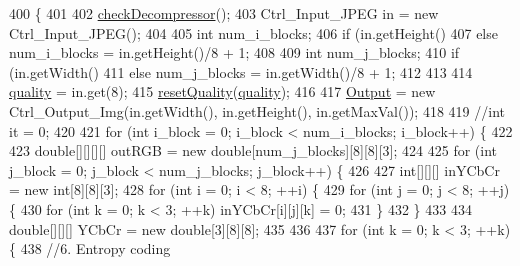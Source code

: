 \begin{DoxyCode}
400                                \{
401 
402         \hyperlink{classdomini_1_1algorithm_1_1Algorithm_a6b738342cc7169893fa60d593f5a13db}{checkDecompressor}();
403         Ctrl\_Input\_JPEG in = \textcolor{keyword}{new} Ctrl\_Input\_JPEG();
404 
405         \textcolor{keywordtype}{int} num\_i\_blocks;
406         \textcolor{keywordflow}{if} (in.getHeight()%
407         \textcolor{keywordflow}{else} num\_i\_blocks = in.getHeight()/8 + 1;
408         
409         \textcolor{keywordtype}{int} num\_j\_blocks;
410         \textcolor{keywordflow}{if} (in.getWidth()%
411         \textcolor{keywordflow}{else} num\_j\_blocks = in.getWidth()/8 + 1;
412 
413 
414         \hyperlink{classdomini_1_1algorithm_1_1JPEG_ae80176d5ff56e613643db55e21c513da}{quality} = in.get(8);
415         \hyperlink{classdomini_1_1algorithm_1_1JPEG_a860d6166ef8edc40b0ffb61942589e5d}{resetQuality}(\hyperlink{classdomini_1_1algorithm_1_1JPEG_ae80176d5ff56e613643db55e21c513da}{quality});
416 
417         \hyperlink{classdomini_1_1algorithm_1_1Algorithm_a4de9955411c656325adc391ef570c082}{Output} = \textcolor{keyword}{new} Ctrl\_Output\_Img(in.getWidth(), in.getHeight(), in.getMaxVal());
418 
419         \textcolor{comment}{//int it = 0;}
420 
421         \textcolor{keywordflow}{for} (\textcolor{keywordtype}{int} i\_block = 0; i\_block < num\_i\_blocks; i\_block++)  \{
422 
423             \textcolor{keywordtype}{double}[][][][] outRGB = \textcolor{keyword}{new} \textcolor{keywordtype}{double}[num\_j\_blocks][8][8][3];
424             
425             \textcolor{keywordflow}{for} (\textcolor{keywordtype}{int} j\_block = 0; j\_block < num\_j\_blocks; j\_block++)  \{
426 
427                 \textcolor{keywordtype}{int}[][][] inYCbCr = \textcolor{keyword}{new} \textcolor{keywordtype}{int}[8][8][3];
428                 \textcolor{keywordflow}{for} (\textcolor{keywordtype}{int} i = 0; i < 8; ++i) \{
429                     \textcolor{keywordflow}{for} (\textcolor{keywordtype}{int} j = 0; j < 8; ++j) \{
430                         \textcolor{keywordflow}{for} (\textcolor{keywordtype}{int} k = 0; k < 3; ++k) inYCbCr[i][j][k] = 0;
431                     \}
432                 \}
433                 
434                 \textcolor{keywordtype}{double}[][][] YCbCr = \textcolor{keyword}{new} \textcolor{keywordtype}{double}[3][8][8];
435 
436                 
437                 \textcolor{keywordflow}{for} (\textcolor{keywordtype}{int} k = 0; k < 3; ++k) \{
438                     \textcolor{comment}{//6. Entropy coding}

\end{DoxyCode}
